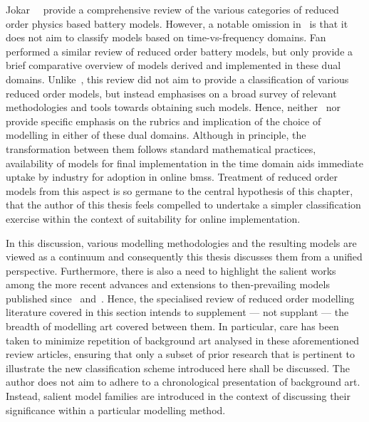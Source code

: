 Jokar~\etal~\cite{Jokar2016}  provide  a  comprehensive review  of  the  various
categories of  reduced order  physics based battery  models. However,  a notable
omission  in~\cite{Jokar2016}  is  that  it  does not  aim  to  classify  models
based  on  time-vs-frequency  domains.  Fan~\etal{}~\cite{Fan2015}  performed  a
similar  review of  reduced  order  battery models,  but  only  provide a  brief
comparative overview  of models derived  and implemented in these  dual domains.
Unlike~\cite{Jokar2016}, this review did not  aim to provide a classification of
various  reduced  order  models,  but  instead  emphasises  on  a  broad  survey
of  relevant  methodologies and  tools  towards  obtaining such  models.  Hence,
neither~\cite{Jokar2016}  nor~\cite{Fan2015} provide  specific  emphasis on  the
rubrics  and implication  of the  choice of  modelling in  either of  these dual
domains. Although in principle, the transformation between them follows standard
mathematical  practices,~  availability of  models for
final implementation  in the time domain  aids immediate uptake by  industry for
adoption  in online  \gls{bms}s. Treatment  of  reduced order  models from  this
aspect  is  so germane  to  the  central  hypothesis of  this  chapter,  that  the  author of  this  thesis
feels  compelled  to undertake  a  simpler  classification exercise  within  the
context  of  suitability for  online  implementation.


In this discussion, various modelling methodologies and the resulting models are
viewed as a continuum and consequently this thesis discusses them from a unified
perspective. Furthermore,  there is also a  need to highlight the  salient works
among  the  more  recent  advances  and  extensions  to  then-prevailing  models
published  since~\cite{Jokar2016}  and~\cite{Fan2015}.  Hence,  the  specialised
review of reduced order modelling literature  covered in this section intends to
supplement ---  not supplant ---  the breadth  of modelling art  covered between
them. In  particular, care has been  taken to minimize repetition  of background
art  analysed in  these aforementioned  review  articles, ensuring  that only  a
subset of prior research that is  pertinent to illustrate the new classification
scheme introduced here shall be discussed. The  author does not aim to adhere to
a chronological presentation of background  art. Instead, salient model families
are  introduced  in  the  context  of discussing  their  significance  within  a
particular modelling method.



